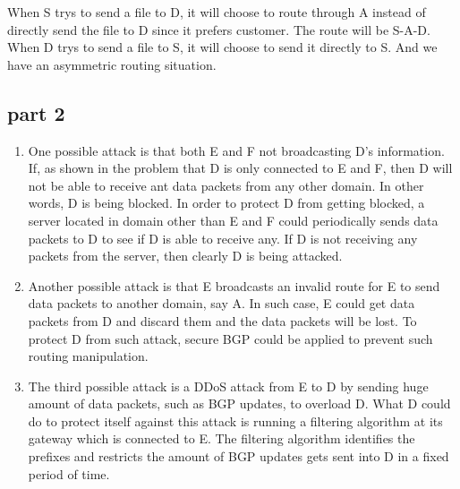 When S trys to send a file to D, it will choose to route through A instead of directly send the file to D since it prefers customer. The route will be S-A-D. When D trys to send a file to S, it will choose to send it directly to S. And we have an asymmetric routing situation.

\subsection{part 2}

\begin{enumerate}
\item One possible attack is that both E and F not broadcasting D's information. If, as shown in the problem that D is only connected to E and F, then D will not be able to receive ant data packets from any other domain. In other words, D is being blocked. In order to protect D from getting blocked, a server located in domain other than E and F could periodically sends data packets to D to see if D is able to receive any. If D is not receiving any packets from the server, then clearly D is being attacked.
\item Another possible attack is that E broadcasts an invalid route for E to send data packets to another domain, say A. In such case, E could get data packets from D and discard them and the data packets will be lost. To protect D from such attack, secure BGP could be applied to prevent such routing manipulation.
\item The third possible attack is a DDoS attack from E to D by sending huge amount of data packets, such as BGP updates, to overload D. What D could do to protect itself against this attack is running a filtering algorithm at its gateway which is connected to E. The filtering algorithm identifies the prefixes and restricts the amount of BGP updates gets sent into D in a fixed period of time.
\end{enumerate}
